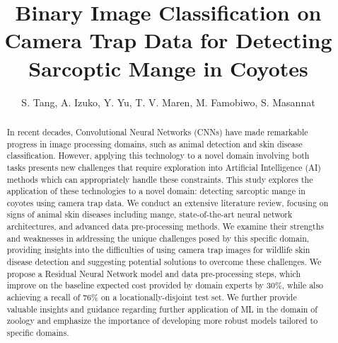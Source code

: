 \documentclass{article}
\title{Binary Image Classification on Camera Trap Data for Detecting Sarcoptic Mange in Coyotes
}
\author{S. Tang, A. Izuko, Y. Yu, T. V. Maren, M. Famobiwo, S. Masannat
}
\begin{document}
\maketitle

\begin{abstract}
In recent decades, Convolutional Neural Networks (CNNs) have made remarkable progress in image processing domains, such as animal detection and skin disease classification. However, applying this technology to a novel domain involving both tasks presents new challenges that require exploration into Artificial Intelligence (AI) methods which can appropriately handle these constraints. This study explores the application of these technologies to a novel domain: detecting sarcoptic mange in coyotes using camera trap data. We conduct an extensive literature review, focusing on signs of animal skin diseases including mange, state-of-the-art neural network architectures, and advanced data pre-processing methods. We examine their strengths and weaknesses in addressing the unique challenges posed by this specific domain, providing insights into the difficulties of using camera trap images for wildlife skin disease detection and suggesting potential solutions to overcome these challenges. We propose a Residual Neural Network model and data pre-processing steps, which improve on the baseline expected cost provided by domain experts by 30\%, while also achieving a recall of 76\% on a locationally-disjoint test set. We further provide valuable insights and guidance regarding further application of ML in the domain of zoology and emphasize the importance of developing more robust models tailored to specific domains.
\end{abstract}
\end{document}
